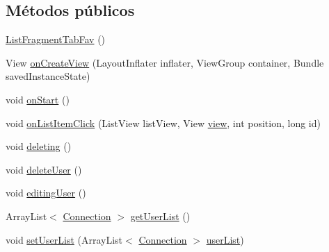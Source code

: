 \subsection*{Métodos públicos}
\begin{DoxyCompactItemize}
\item 
\hyperlink{classes_1_1ucm_1_1tfg_1_1controlremotolinux_1_1client_1_1controller_1_1ListFragmentTabFav_af231e76c25ec94a463951706f5b83d8c}{List\-Fragment\-Tab\-Fav} ()
\item 
View \hyperlink{classes_1_1ucm_1_1tfg_1_1controlremotolinux_1_1client_1_1controller_1_1ListFragmentTabFav_afe2ab3c1f846b513ed871f70b09bedbc}{on\-Create\-View} (Layout\-Inflater inflater, View\-Group container, Bundle saved\-Instance\-State)
\item 
void \hyperlink{classes_1_1ucm_1_1tfg_1_1controlremotolinux_1_1client_1_1controller_1_1ListFragmentTabFav_adf668ef24a4f5767e611747bac7e90d7}{on\-Start} ()
\item 
void \hyperlink{classes_1_1ucm_1_1tfg_1_1controlremotolinux_1_1client_1_1controller_1_1ListFragmentTabFav_ab56bb32e1c6c9a44002c7a762fa9cfd7}{on\-List\-Item\-Click} (List\-View list\-View, View \hyperlink{classes_1_1ucm_1_1tfg_1_1controlremotolinux_1_1client_1_1controller_1_1ListFragmentTabFav_a3950d582ad9294240404e931f556ed64}{view}, int position, long id)
\item 
void \hyperlink{classes_1_1ucm_1_1tfg_1_1controlremotolinux_1_1client_1_1controller_1_1ListFragmentTabFav_ab8755e292fff39c2bdf056f45b17274e}{deleting} ()
\item 
void \hyperlink{classes_1_1ucm_1_1tfg_1_1controlremotolinux_1_1client_1_1controller_1_1ListFragmentTabFav_a1eee25125dce3115b462ee351812a15e}{delete\-User} ()
\item 
void \hyperlink{classes_1_1ucm_1_1tfg_1_1controlremotolinux_1_1client_1_1controller_1_1ListFragmentTabFav_a8be362868405124ecd91e95216cdd3bf}{editing\-User} ()
\item 
Array\-List$<$ \hyperlink{classes_1_1ucm_1_1tfg_1_1controlremotolinux_1_1client_1_1model_1_1sql_1_1Connection}{Connection} $>$ \hyperlink{classes_1_1ucm_1_1tfg_1_1controlremotolinux_1_1client_1_1controller_1_1ListFragmentTabFav_a901fb135b1ce87458f6a7fc1b8c1be70}{get\-User\-List} ()
\item 
void \hyperlink{classes_1_1ucm_1_1tfg_1_1controlremotolinux_1_1client_1_1controller_1_1ListFragmentTabFav_ad7aa720b252088ee27e8673fc78eb42d}{set\-User\-List} (Array\-List$<$ \hyperlink{classes_1_1ucm_1_1tfg_1_1controlremotolinux_1_1client_1_1model_1_1sql_1_1Connection}{Connection} $>$ \hyperlink{classes_1_1ucm_1_1tfg_1_1controlremotolinux_1_1client_1_1controller_1_1ListFragmentTabFav_a6cb5aca93a7ccbca55d49a64794817e6}{user\-List})
\end{DoxyCompactItemize}
